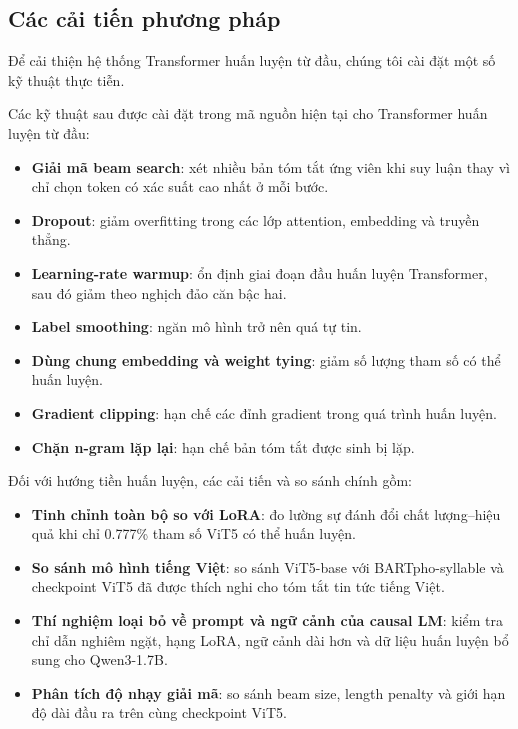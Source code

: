 \documentclass[conference]{IEEEtran}
\begin{document}
\subsection{Các cải tiến phương pháp}
Để cải thiện hệ thống Transformer huấn luyện từ đầu, chúng tôi cài đặt một số kỹ thuật thực tiễn.

Các kỹ thuật sau được cài đặt trong mã nguồn hiện tại cho Transformer huấn luyện từ đầu:
\begin{itemize}
    \item \textbf{Giải mã beam search}: xét nhiều bản tóm tắt ứng viên khi suy luận thay vì chỉ chọn token có xác suất cao nhất ở mỗi bước.
    \item \textbf{Dropout}: giảm overfitting trong các lớp attention, embedding và truyền thẳng.
    \item \textbf{Learning-rate warmup}: ổn định giai đoạn đầu huấn luyện Transformer, sau đó giảm theo nghịch đảo căn bậc hai.
    \item \textbf{Label smoothing}: ngăn mô hình trở nên quá tự tin.
    \item \textbf{Dùng chung embedding và weight tying}: giảm số lượng tham số có thể huấn luyện.
    \item \textbf{Gradient clipping}: hạn chế các đỉnh gradient trong quá trình huấn luyện.
    \item \textbf{Chặn n-gram lặp lại}: hạn chế bản tóm tắt được sinh bị lặp.
\end{itemize}

Đối với hướng tiền huấn luyện, các cải tiến và so sánh chính gồm:
\begin{itemize}
    \item \textbf{Tinh chỉnh toàn bộ so với LoRA}: đo lường sự đánh đổi chất lượng--hiệu quả khi chỉ 0.777\% tham số ViT5 có thể huấn luyện.
    \item \textbf{So sánh mô hình tiếng Việt}: so sánh ViT5-base với BARTpho-syllable và checkpoint ViT5 đã được thích nghi cho tóm tắt tin tức tiếng Việt.
    \item \textbf{Thí nghiệm loại bỏ về prompt và ngữ cảnh của causal LM}: kiểm tra chỉ dẫn nghiêm ngặt, hạng LoRA, ngữ cảnh dài hơn và dữ liệu huấn luyện bổ sung cho Qwen3-1.7B.
    \item \textbf{Phân tích độ nhạy giải mã}: so sánh beam size, length penalty và giới hạn độ dài đầu ra trên cùng checkpoint ViT5.
\end{itemize}

\end{document}
